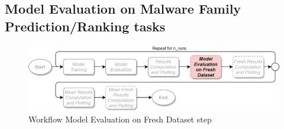 \documentclass[pdfa%
,cucitura%
]{toptesi}
\begin{document}
\subsection{Model Evaluation on Malware Family Prediction/Ranking tasks}
\begin{figure}[h!]
	\centering
	\includegraphics[width=\textwidth]{./images/workflow_fresh_eval.png}
	\caption[Fresh dataset model evaluation workflow step]{Workflow Model Evaluation on Fresh Dataset step}
	\label{fig:workflow_fresh_eval}
\end{figure}
\end{document}
